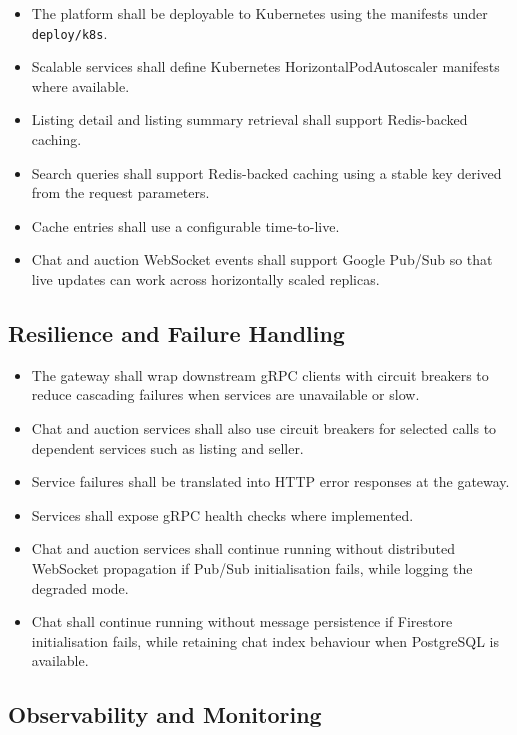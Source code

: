 \begin{itemize}
    \item The platform shall be deployable to Kubernetes using the manifests under \texttt{deploy/k8s}.
    \item Scalable services shall define Kubernetes HorizontalPodAutoscaler manifests where available.
    \item Listing detail and listing summary retrieval shall support Redis-backed caching.
    \item Search queries shall support Redis-backed caching using a stable key derived from the request parameters.
    \item Cache entries shall use a configurable time-to-live.
    \item Chat and auction WebSocket events shall support Google Pub/Sub so that live updates can work across horizontally scaled replicas.
\end{itemize}

\newpage 

\subsection{Resilience and Failure Handling}

\begin{itemize}
    \item The gateway shall wrap downstream gRPC clients with circuit breakers to reduce cascading failures when services are unavailable or slow.
    \item Chat and auction services shall also use circuit breakers for selected calls to dependent services such as listing and seller.
    \item Service failures shall be translated into HTTP error responses at the gateway.
    \item Services shall expose gRPC health checks where implemented.
    \item Chat and auction services shall continue running without distributed WebSocket propagation if Pub/Sub initialisation fails, while logging the degraded mode.
    \item Chat shall continue running without message persistence if Firestore initialisation fails, while retaining chat index behaviour when PostgreSQL is available.
\end{itemize}

\subsection{Observability and Monitoring}

